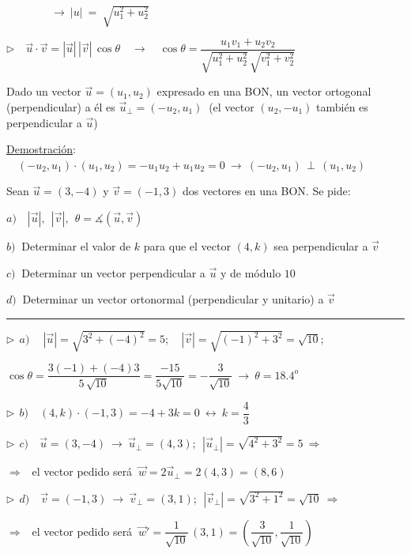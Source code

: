 $\qquad \qquad  \to \ |u|\ = \ \sqrt{u_1^2+u_2^2} $\QED

$\triangleright \quad \vec u \cdot \vec v = |\vec u|\, |\vec v| \, \cos \theta \quad \to  \quad  \cos \theta=\dfrac{ u_1v_1+u_2v_2 }{\sqrt{u_1^2+u_2^2}\,\sqrt{v_1^2+v_2^2}} $\QED

\vspace{4mm}
\begin{theorem}

Dado un vector $\vec u=(u_1,u_2)$ expresado en una BON, un vector ortogonal (perpendicular) a él es 	$\vec u_\perp=(-u_2,u_1)\ $ \textcolor{gris}{(el vector $(u_2,-u_1)$ también es perpendicular a $\vec u$)} 
\end{theorem}
\underline{Demostración}: $\quad (-u_2,u_1)\cdot (u_1,u_2)=-u_1u_2+u_1u_2=0 \ \to \ (-u_2,u_1)\, \perp \,  (u_1,u_2)$\QED

\vspace{4mm}
\begin{miejercicio}	

Sean $\vec u=(3,-4)$ y $\vec v=(-1,3)$ dos vectores en una BON. Se pide:

\vspace{2mm} $a)\quad |\vec u|,\ \ |\vec v|,\ \ \theta=\measuredangle(\vec u, \vec v) $ 

$b)\ $ Determinar el valor de $k$ para que el vector $(4,k)$ sea perpendicular a $\vec v$

$c)\ $ Determinar un vector perpendicular a $\vec u$ y de módulo $10$

$d)\ $ Determinar un vector ortonormal (perpendicular y unitario) a $\vec v $

\rule{250pt}{0.1pt}

\vspace{2mm} $	\triangleright \ \ a)\quad  \ |\vec u|=\sqrt{3^2+(-4)^2}=5;\quad |\vec v|=\sqrt{(-1)^2+3^2}=\sqrt{10};$

\vspace{2mm}$ \cos \theta=\dfrac{3(-1)+(-4)3}{5\, \sqrt{10}}=\dfrac{-15}{5\sqrt{10}}=-\dfrac{3}{\sqrt{10}} \ \to \ \theta=18.4^o$

\vspace{4mm} $	\triangleright \ \ b)\quad (4,k)\cdot (-1,3)=-4+3k=0 \ \leftrightarrow \ k=\dfrac 4 3 $

\vspace{4mm} $	\triangleright \ \ c)\quad  \vec u=(3,-4)\ \to \ \vec u_\perp =(4,3);\ \ |\vec u_\perp|=\sqrt{4^2+3^2}=5 \ \Rightarrow \ $ 

\vspace{2mm} $\Rightarrow \ \ $ el vector pedido será $\ \vec w=2\vec u_\perp=2(4,3)=(8,6)$

\vspace{4mm} $	\triangleright \ \ d)\quad  \vec v=(-1,3) \ \to \ \vec v_\perp=(3,1);\ \ |\vec v_\perp|=\sqrt{3^2+1^2}=\sqrt{10} \ \Rightarrow \ $ 

\vspace{2mm} $\Rightarrow \ \ $ el vector pedido será $\ \vec w'=\dfrac{1}{\sqrt{10}}\, (3,1) = \left( \dfrac{3}{\sqrt{10}} , \dfrac{1}{\sqrt{10}} \right)$

	
\end{miejercicio}


